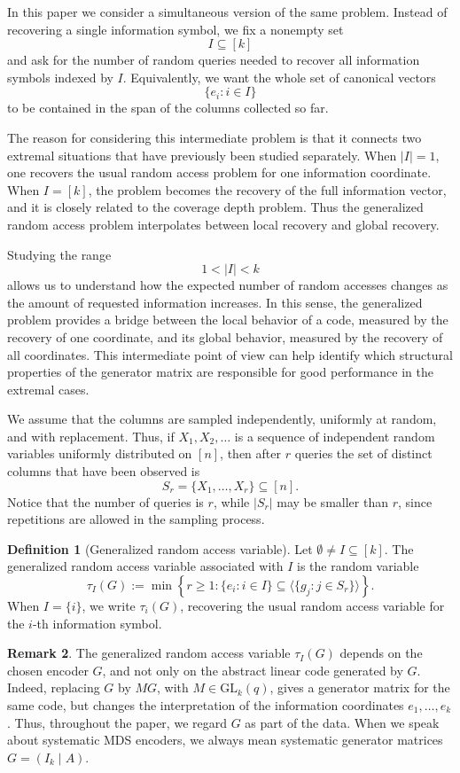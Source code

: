 \documentclass[11pt,a4paper]{article}
\numberwithin{equation}{section}
\theoremstyle{definition}
\newtheorem{definition}{Definition}[section]
\newtheorem{remark}[definition]{Remark}
\theoremstyle{definition}
\newcommand{\Span}{\langle}
\begin{document}
In this paper we consider a simultaneous version of the same problem.  Instead of recovering a single information symbol, we fix a nonempty set
\[
I\subseteq [k]
\]
and ask for the number of random queries needed to recover all information symbols indexed by $I$.  Equivalently, we want the whole set of canonical vectors
\[
\{e_i : i\in I\}
\]
to be contained in the span of the columns collected so far.

{The reason for considering this intermediate problem is that it connects two extremal situations that have previously been studied separately.}  When $|I|=1$, one recovers the usual random access problem for one information coordinate.  When $I=[k]$, the problem becomes the recovery of the full information vector, and it is closely related to the coverage depth problem.  Thus the generalized random access problem interpolates between local recovery and global recovery.

Studying the range
\[
1<|I|<k
\]
allows us to understand how the expected number of random accesses changes as the amount of requested information increases.  In this sense, the generalized problem provides a bridge between the local behavior of a code, measured by the recovery of one coordinate, and its global behavior, measured by the recovery of all coordinates.  This intermediate point of view can help identify which structural properties of the generator matrix are responsible for good performance in the extremal cases.

We assume that the columns are sampled independently, uniformly at random, and with replacement.  Thus, if $X_1,X_2,\ldots$ is a sequence of independent random variables uniformly distributed on $[n]$, then after $r$ queries the set of distinct columns that have been observed is
\[
S_r=\{X_1,\ldots,X_r\}\subseteq [n].
\]
Notice that the number of queries is $r$, while $|S_r|$ may be smaller than $r$, since repetitions are allowed in the sampling process.

\begin{definition}[Generalized random access variable]
Let $\emptyset\neq I\subseteq [k]$.  The generalized random access variable associated with $I$ is the random variable
\[
\tau_I(G):=
\min\left\{
r\geq 1:
\{e_i : i\in I\}\subseteq
\Span\{g_j : j\in S_r\}\rangle
\right\}.
\]
When $I=\{i\}$, we write $\tau_i(G)$, recovering the usual random access variable for the $i$-th information symbol.
\end{definition}

\begin{remark}\label{rem:encoder-dependence}
The generalized random access variable $\tau_I(G)$ depends on the chosen
encoder $G$, and not only on the abstract linear code generated by $G$.
Indeed, replacing $G$ by $MG$, with $M\in \mathrm{GL}_k(q)$, gives a
generator matrix for the same code, but changes the interpretation of the
information coordinates $e_1,\ldots,e_k$.  Thus, throughout the paper, we
regard $G$ as part of the data.  When we speak about systematic MDS
encoders, we always mean systematic generator matrices $G=(I_k\mid A)$.
\end{remark}
\end{document}
